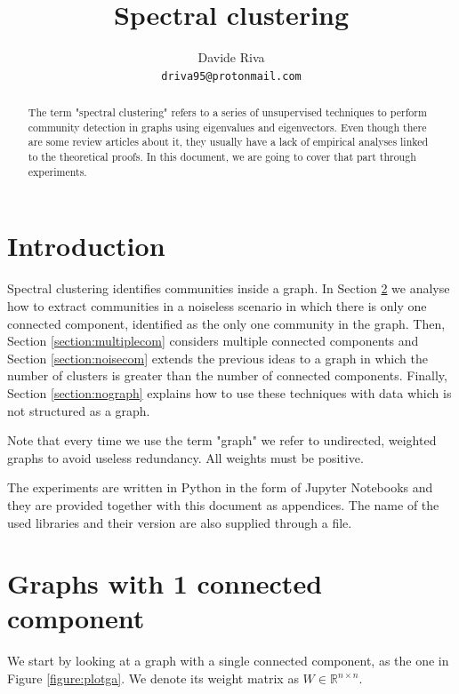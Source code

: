 \documentclass{article}
\title{Spectral clustering}
\author{%
  Davide Riva \\
  \texttt{driva95@protonmail.com}
}
\begin{document}
\maketitle

\begin{abstract}
    The term "spectral clustering" refers to a series of unsupervised techniques to perform community detection in graphs using eigenvalues and eigenvectors.
    Even though there are some review articles about it, they usually have a lack of empirical analyses linked to the theoretical proofs.
    In this document, we are going to cover that part through experiments.
\end{abstract}

\section{Introduction}
Spectral clustering identifies communities inside a graph.
In Section \ref{section:twocom} we analyse how to extract communities in a noiseless scenario
in which there is only one connected component, identified as the only one community in the graph.
Then, Section \ref{section:multiplecom} considers multiple connected components and
Section \ref{section:noisecom} extends the previous ideas to a graph in which
the number of clusters is greater than the number of connected components.
Finally, Section \ref{section:nograph} explains how to use these techniques with data
which is not structured as a graph.

Note that every time we use the term "graph" we refer to undirected, weighted graphs
to avoid useless redundancy. All weights must be positive.

The experiments are written in Python in the form of Jupyter Notebooks
and they are provided together with this document as appendices.
The name of the used libraries and their version are also supplied through a  file.

\section{Graphs with 1 connected component} \label{section:twocom}
We start by looking at a graph with a single connected component, as the one in Figure \ref{figure:plotga}.
We denote its weight matrix as $W \in \mathbb{R}^{n \times n}$.
\end{document}
